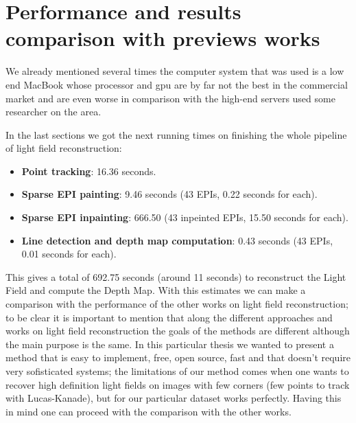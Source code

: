 \section{Performance and results comparison with previews works}

We already mentioned several times the computer system that was used is a low end MacBook whose processor and gpu are by far not the best in the commercial market and are even worse in comparison with the high-end servers used some researcher on the area. 

\bigskip

In the last sections we got the next running times on finishing the whole pipeline of light field reconstruction:

\begin{itemize}
\item \textbf{Point tracking}: 16.36 seconds.
\item \textbf{Sparse EPI painting}: 9.46 seconds (43 EPIs, 0.22 seconds for each).
\item \textbf{Sparse EPI inpainting}: 666.50 (43 inpeinted EPIs, 15.50 seconds for each).
\item \textbf{Line detection and depth map computation}: 0.43 seconds (43 EPIs, 0.01 seconds for each).
\end{itemize}

This gives a total of 692.75 seconds (around 11 seconds) to reconstruct the Light Field and compute the Depth Map. With this estimates we can make a comparison with the performance of the other works on light field reconstruction; to be clear it is important to mention that along the different approaches and works on light field reconstruction the goals of the methods are different although the main purpose is the same. In this particular thesis we wanted to present a method that is easy to implement, free, open source, fast and that doesn't require very sofisticated systems; the limitations of our method comes when one wants to recover high definition light fields on images with few corners (few points to track with Lucas-Kanade), but for our particular dataset works perfectly. Having this in mind one can proceed with the comparison with the other works.

